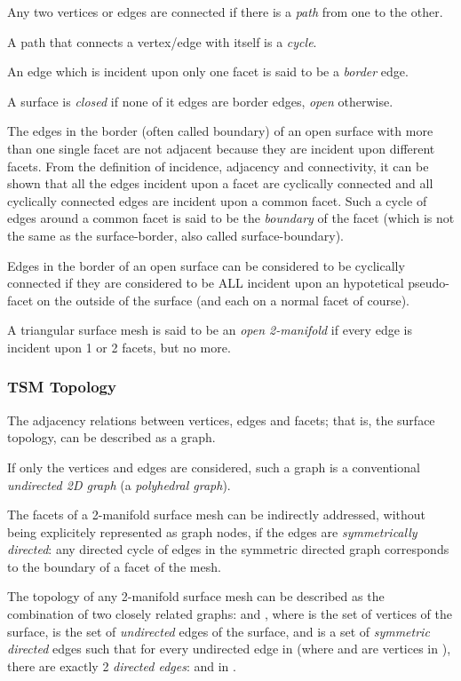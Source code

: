 Any two vertices or edges are connected if there is a {\em path} from one to the other.

A path that connects a vertex/edge with itself is a {\em cycle}.

An edge which is incident upon only one facet is said to be a {\em border} edge. 

A surface is {\em closed} if none of it edges are border edges, {\em open} otherwise.

The edges in the border (often called boundary) of an open surface with more than one single facet are not adjacent because they are incident upon different facets. From the definition of incidence, adjacency and connectivity, it can be shown that all the edges incident upon a facet are cyclically connected and all cyclically connected edges are incident upon a common facet. Such a cycle of edges around a common facet is said to be the {\em boundary} of the facet (which is not the same as the surface-border, also called surface-boundary).

Edges in the border of an open surface can be considered to be cyclically connected if they are considered to be ALL  incident upon an hypotetical pseudo-facet on the outside of the surface (and each on a normal facet of course).

A triangular surface mesh is said to be an {\em open 2-manifold} if every edge is incident upon 1 or 2 facets, but no more.

\subsubsection{TSM Topology}

The adjacency relations between vertices, edges and facets; that is, the surface topology, can be described as a graph.

If only the vertices and edges are considered, such a graph is a conventional {\em undirected 2D graph} (a {\em polyhedral graph}).

The facets of a 2-manifold surface mesh can be indirectly addressed, without being explicitely represented as graph nodes, if the edges are {\em symmetrically directed}: any directed cycle of edges in the symmetric directed graph corresponds to the boundary of a facet of the mesh.

The topology of any 2-manifold surface mesh can be described as the combination of two closely related graphs:  and , where  is the set of vertices of the surface,  is the set of {\em undirected} edges of the surface, and  is a set of {\em symmetric directed} edges such that for every undirected edge  in  (where  and  are vertices in ), there are exactly 2 {\em directed edges}:  and  in .


